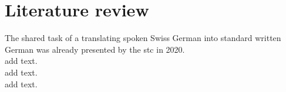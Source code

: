 \section{Literature review}
The shared task of a translating spoken Swiss German into standard written German was already presented by the \gls{stc} in 2020.\\\cite{pluss2020} add text.\\\cite{buechi2020} add text.\\\cite{Kew2020} add text.
